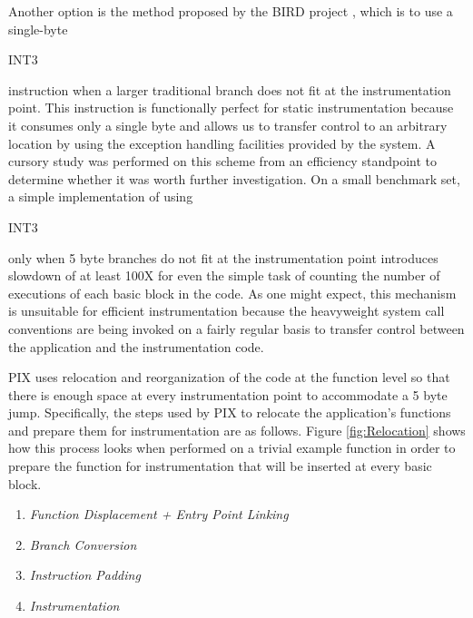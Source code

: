 Another option is the method proposed by the BIRD project \cite{nanda2006bird}, which
is to use a single-byte \begin{it}INT3\end{it} instruction when a larger traditional
branch does not fit at the instrumentation point. This instruction is functionally
perfect for static instrumentation because it consumes only a single byte and
allows us to transfer control to an arbitrary location by using the exception handling
facilities provided by the system. A cursory study was performed on this scheme
from an efficiency standpoint to determine whether it was worth further
investigation. On a small benchmark set, a simple implementation of using
\begin{it}INT3\end{it} only when 5 byte branches do not fit at
the instrumentation point introduces slowdown of at least 100X for
even the simple task of counting the number of executions of each basic block in the code. As one might
expect, this mechanism is unsuitable for efficient instrumentation because the
heavyweight system call conventions are being invoked on a fairly regular basis to
transfer control between the application and the instrumentation code.

PIX uses relocation and reorganization of the code at the function level so that
there is enough space at every instrumentation point to accommodate a 5 byte
jump. Specifically, the steps used by PIX to relocate the application's functions and prepare them
for instrumentation are as follows. Figure \ref{fig:Relocation} shows how this process looks when performed on 
a trivial example function in order to prepare the function for instrumentation
that will be inserted at every basic block.

\begin{enumerate}
 \item \textit{Function Displacement + Entry Point Linking}
 \item \textit{Branch Conversion}
 \item \textit{Instruction Padding}
 \item \textit{Instrumentation}
\end{enumerate}

